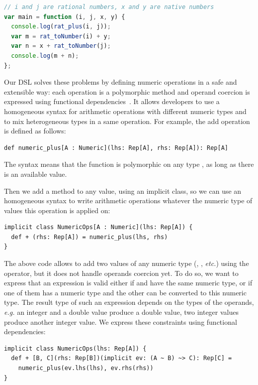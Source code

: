 \documentclass[american,english,runningheads]{llncs}
\newcommand{\eg}{\emph{e.g.}}
\newcommand{\etc}{\emph{etc.}}
\begin{document}
\begin{lstlisting}[language=JavaScript,label=type-coercion,caption=Mixing integer and floating-point arithmetic in
JavaScript.]
// i and j are rational numbers, x and y are native numbers
var main = function (i, j, x, y) {
  console.log(rat_plus(i, j));
  var m = rat_toNumber(i) + y;
  var n = x + rat_toNumber(j);
  console.log(m + n);
};
\end{lstlisting}


Our DSL solves these problems by defining numeric operations in a safe and extensible way: each operation is a
polymorphic method and operand coercion is expressed using functional dependencies~\cite{Jones00_FunDeps}. It allows
developers to use a homogeneous syntax for arithmetic operations with different numeric types and to mix
heterogeneous types in a same operation. For example, the add operation is defined as follows:

\begin{lstlisting}
def numeric_plus[A : Numeric](lhs: Rep[A], rhs: Rep[A]): Rep[A]
\end{lstlisting}

The  syntax means that the function is polymorphic on any type , as long as there is an
available  value.

Then we add a \code{+} method to any  value, using an implicit class, so we can use an homogeneous
syntax to write arithmetic operations whatever the numeric type of values this operation is applied on:

\begin{lstlisting}
implicit class NumericOps[A : Numeric](lhs: Rep[A]) {
  def + (rhs: Rep[A]) = numeric_plus(lhs, rhs)
}
\end{lstlisting}

The above code allows to add two values of any numeric type (, , \etc) using the \code{+}
operator, but it does not handle operands coercion yet. To do so, we want to express that an expression
 is valid either if  and  have the same numeric type, or if one of them has a numeric
type and the other can be converted to this numeric type. The result type of such an expression depends on the types
of the operands, \eg{} an integer and a double value produce a double value, two integer values produce another
integer value. We express these constraints using functional dependencies:

\begin{lstlisting}
implicit class NumericOps(lhs: Rep[A]) {
  def + [B, C](rhs: Rep[B])(implicit ev: (A ~ B) ~> C): Rep[C] =
    numeric_plus(ev.lhs(lhs), ev.rhs(rhs))
}
\end{lstlisting}
\end{document}
